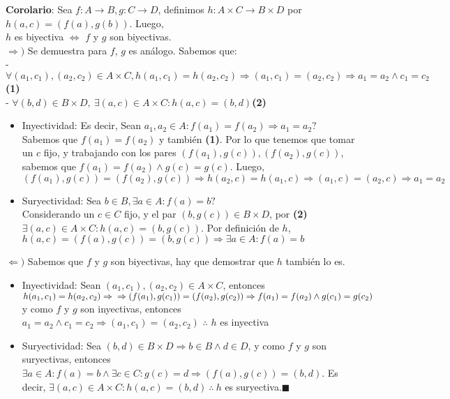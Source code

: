 \documentclass[11pt,a4paper]{article}
\newcommand*{\QEDA}{\null\nobreak\hfill\ensuremath{\blacksquare}}
\begin{document}
\noindent \textbf{Corolario}: Sea $f : A \rightarrow B, g : C \rightarrow D$, definimos $h : A \times C \rightarrow B \times D$ por $h(a,c) = (f(a),g(b))$. Luego, \\ $h$ es biyectiva $\iff$ $f$ y $g$ son biyectivas.\\
$\Rightarrow)$ Se demuestra para $f$, $g$ es an\'alogo. Sabemos que: \\ 
\indent - $\forall (a_1,c_1), (a_2,c_2) \in A \times C, h(a_1, c_1) = h(a_2,c_2) \Rightarrow (a_1,c_1) = (a_2,c_2) \Rightarrow a_1 = a_2 \land c_1 = c_2$ \hfill \textbf{(1)}\\
\indent - $\forall (b,d) \in B \times D,\ \exists (a,c) \in A \times C : h(a,c) = (b,d)$\hfill \textbf{(2)}
\begin{itemize}
\item Inyectividad: Es decir, Sean $a_1,a_2 \in A : f(a_1) = f(a_2) \Rightarrow a_1 = a_2?$\\
Sabemos que $f(a_1) = f(a_2)$ y tambi\'en \textbf{(1)}. Por lo que tenemos que tomar un $c$ fijo, y trabajando con los pares $(f(a_1),g(c)), (f(a_2),g(c))$, sabemos que $f(a_1) = f(a_2) \land g(c) = g(c)$. Luego, $(f(a_1),g(c)) = (f(a_2),g(c)) \Rightarrow h(a_2, c) = h(a_1, c) \Rightarrow (a_1,c) = (a_2,c) \Rightarrow a_1 = a_2$
\item Suryectividad: Sea $b \in B, \exists a \in A : f(a) = b?$\\
Considerando un $c \in C$ fijo, y el par $(b,g(c)) \in B \times D$, por \textbf{(2)} $\exists (a,c) \in A \times C : h(a,c) = (b,g(c))$. Por definici\'on de $h$, $h(a,c) = (f(a),g(c)) = (b,g(c)) \Rightarrow \exists a \in A : f(a) = b$
\end{itemize}
$\Leftarrow)$ Sabemos que $f$ y $g$ son biyectivas, hay que demostrar que $h$ tambi\'en lo es.
\begin{itemize}
\item Inyectividad: Sean $(a_1,c_1), (a_2,c_2) \in A \times C$, entonces $h(a_1,c_1) = h(a_2,c_2) \Rightarrow \\ \Rightarrow (f(a_1),g(c_1)) = (f(a_2),g(c_2)) \Rightarrow f(a_1) = f(a_2) \land g(c_1) = g(c_2)$ y como $f$ y $g$ son inyectivas, entonces $a_1 = a_2 \land c_1 = c_2 \Rightarrow (a_1, c_1) = (a_2,c_2)$ $\therefore$ $h$ es inyectiva
\item Suryectividad: Sea $(b,d) \in B \times D \Rightarrow b \in B \land d \in D$, y como $f$ y $g$ son suryectivas, entonces $\exists a \in A : f(a) = b \land \exists c \in C : g(c) = d \Rightarrow (f(a),g(c)) = (b,d)$. Es decir, $\exists (a,c) \in A \times C : h(a,c) = (b,d)\ \therefore\ h$ es suryectiva.\QEDA\\
\end{itemize}
\newpage
\end{document}
